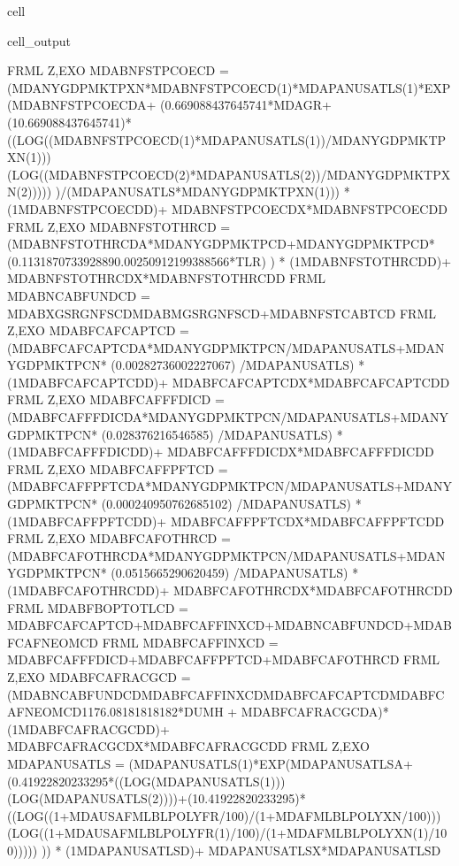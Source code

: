 \documentclass[letterpaper,10pt,english]{jupyterBook}
\begin{document}
\begin{sphinxuseclass}{cell}
\begin{sphinxVerbatimOutput}
\begin{sphinxuseclass}{cell_output}
\begin{sphinxVerbatim}[commandchars=\\\{\}]
FRML \PYGZlt{}Z,EXO\PYGZgt{} MDABNFSTPCOECD = (MDANYGDPMKTPXN*MDABNFSTPCOECD(\PYGZhy{}1)*MDAPANUSATLS(\PYGZhy{}1)*EXP(MDABNFSTPCOECD\PYGZus{}A+ (0.669088437645741*MDAGR+(1\PYGZhy{}0.669088437645741)*((LOG((MDABNFSTPCOECD(\PYGZhy{}1)*MDAPANUSATLS(\PYGZhy{}1))/MDANYGDPMKTPXN(\PYGZhy{}1)))\PYGZhy{}(LOG((MDABNFSTPCOECD(\PYGZhy{}2)*MDAPANUSATLS(\PYGZhy{}2))/MDANYGDPMKTPXN(\PYGZhy{}2))))) )/(MDAPANUSATLS*MDANYGDPMKTPXN(\PYGZhy{}1))) * (1\PYGZhy{}MDABNFSTPCOECD\PYGZus{}D)+ MDABNFSTPCOECD\PYGZus{}X*MDABNFSTPCOECD\PYGZus{}D  \PYGZdl{}
FRML \PYGZlt{}Z,EXO\PYGZgt{} MDABNFSTOTHRCD = (MDABNFSTOTHRCD\PYGZus{}A*MDANYGDPMKTPCD+MDANYGDPMKTPCD* (0.113187073392889\PYGZhy{}0.00250912199388566*T\PYGZus{}LR) ) * (1\PYGZhy{}MDABNFSTOTHRCD\PYGZus{}D)+ MDABNFSTOTHRCD\PYGZus{}X*MDABNFSTOTHRCD\PYGZus{}D  \PYGZdl{}
FRML  \PYGZlt{}\PYGZgt{} MDABNCABFUNDCD = MDABXGSRGNFSCD\PYGZhy{}MDABMGSRGNFSCD+MDABNFSTCABTCD \PYGZdl{}
FRML \PYGZlt{}Z,EXO\PYGZgt{} MDABFCAFCAPTCD = (MDABFCAFCAPTCD\PYGZus{}A*MDANYGDPMKTPCN/MDAPANUSATLS+MDANYGDPMKTPCN* (0.00282736002227067) /MDAPANUSATLS) * (1\PYGZhy{}MDABFCAFCAPTCD\PYGZus{}D)+ MDABFCAFCAPTCD\PYGZus{}X*MDABFCAFCAPTCD\PYGZus{}D  \PYGZdl{}
FRML \PYGZlt{}Z,EXO\PYGZgt{} MDABFCAFFFDICD = (MDABFCAFFFDICD\PYGZus{}A*MDANYGDPMKTPCN/MDAPANUSATLS+MDANYGDPMKTPCN* (\PYGZhy{}0.028376216546585) /MDAPANUSATLS) * (1\PYGZhy{}MDABFCAFFFDICD\PYGZus{}D)+ MDABFCAFFFDICD\PYGZus{}X*MDABFCAFFFDICD\PYGZus{}D  \PYGZdl{}
FRML \PYGZlt{}Z,EXO\PYGZgt{} MDABFCAFFPFTCD = (MDABFCAFFPFTCD\PYGZus{}A*MDANYGDPMKTPCN/MDAPANUSATLS+MDANYGDPMKTPCN* (\PYGZhy{}0.000240950762685102) /MDAPANUSATLS) * (1\PYGZhy{}MDABFCAFFPFTCD\PYGZus{}D)+ MDABFCAFFPFTCD\PYGZus{}X*MDABFCAFFPFTCD\PYGZus{}D  \PYGZdl{}
FRML \PYGZlt{}Z,EXO\PYGZgt{} MDABFCAFOTHRCD = (MDABFCAFOTHRCD\PYGZus{}A*MDANYGDPMKTPCN/MDAPANUSATLS+MDANYGDPMKTPCN* (\PYGZhy{}0.0515665290620459) /MDAPANUSATLS) * (1\PYGZhy{}MDABFCAFOTHRCD\PYGZus{}D)+ MDABFCAFOTHRCD\PYGZus{}X*MDABFCAFOTHRCD\PYGZus{}D  \PYGZdl{}
FRML  \PYGZlt{}\PYGZgt{} MDABFBOPTOTLCD = MDABFCAFCAPTCD+MDABFCAFFINXCD+MDABNCABFUNDCD+MDABFCAFNEOMCD \PYGZdl{}
FRML  \PYGZlt{}\PYGZgt{} MDABFCAFFINXCD = MDABFCAFFFDICD+MDABFCAFFPFTCD+MDABFCAFOTHRCD \PYGZdl{}
FRML \PYGZlt{}Z,EXO\PYGZgt{} MDABFCAFRACGCD = (\PYGZhy{}MDABNCABFUNDCD\PYGZhy{}MDABFCAFFINXCD\PYGZhy{}MDABFCAFCAPTCD\PYGZhy{}MDABFCAFNEOMCD\PYGZhy{}1176.08181818182*DUMH + MDABFCAFRACGCD\PYGZus{}A)* (1\PYGZhy{}MDABFCAFRACGCD\PYGZus{}D)+ MDABFCAFRACGCD\PYGZus{}X*MDABFCAFRACGCD\PYGZus{}D  \PYGZdl{}
FRML \PYGZlt{}Z,EXO\PYGZgt{} MDAPANUSATLS = (MDAPANUSATLS(\PYGZhy{}1)*EXP(MDAPANUSATLS\PYGZus{}A+ (0.41922820233295*((LOG(MDAPANUSATLS(\PYGZhy{}1)))\PYGZhy{}(LOG(MDAPANUSATLS(\PYGZhy{}2))))+(1\PYGZhy{}0.41922820233295)*((LOG((1+MDAUSAFMLBLPOLYFR/100)/(1+MDAFMLBLPOLYXN/100)))\PYGZhy{}(LOG((1+MDAUSAFMLBLPOLYFR(\PYGZhy{}1)/100)/(1+MDAFMLBLPOLYXN(\PYGZhy{}1)/100))))) )) * (1\PYGZhy{}MDAPANUSATLS\PYGZus{}D)+ MDAPANUSATLS\PYGZus{}X*MDAPANUSATLS\PYGZus{}D  \PYGZdl{}

\end{sphinxVerbatim}
\end{sphinxuseclass}
\end{sphinxVerbatimOutput}
\end{sphinxuseclass}
\end{document}

